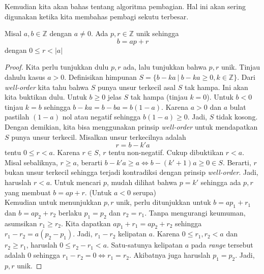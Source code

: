 	Kemudian kita akan bahas tentang algoritma pembagian. Hal ini akan sering digunakan ketika kita membahas pembagi sekutu terbesar.
	\begin{theorem}
		Misal $a,b \in \mathbb{Z}$ dengan $a \ne 0$. Ada $p,r \in \mathbb{Z}$ unik sehingga $$b = ap + r$$ dengan $0 \le r < |a|$
	\end{theorem}
	\begin{proof}
		Kita perlu tunjukkan dulu $p,r$ ada, lalu tunjukkan bahwa $p,r$ unik. Tinjau dahulu kasus $a > 0$. 
		Definisikan himpunan $S = \{ b - ka \ | \ b-ka \ge 0, k \in \mathbb{Z} \}$. Dari \textit{well-order} kita tahu bahwa $S$ punya unsur terkecil asal $S$ tak hampa. Ini akan kita buktikan dulu. Untuk $b \ge 0$ jelas $S$ tak hampa (tinjau $k = 0$). Untuk $b < 0$ tinjau $k = b$ sehingga $b - ka = b - ba = b(1-a)$. Karena $a > 0$ dan $a$ bulat pastilah $(1-a)$ nol atau negatif sehingga $b(1-a) \ge 0$. Jadi, $S$ tidak kosong. Dengan demikian, kita bisa menggunakan prinsip \textit{well-order} untuk mendapatkan $S$ punya unsur terkecil. Misalkan unsur terkecilnya adalah $$r = b - k'a$$ tentu $0 \le r < a$. Karena $r \in S$, $r$ tentu non-negatif. Cukup dibuktikan $r < a$. Misal sebaliknya, $r \ge a$, berarti $b - k'a \ge a \iff b - (k'+1)a \ge 0 \in S$. Berarti, $r$ bukan unsur terkecil sehingga terjadi kontradiksi dengan prinsip \textit{well-order}. Jadi, haruslah $r < a$. Untuk mencari $p$, mudah dilihat bahwa $p = k'$ sehingga ada $p,r$ yang membuat $b = ap + r$. (Untuk $a < 0$ serupa)
		\\
		
		Kemudian untuk menunjukkan $p,r$ unik, perlu ditunjukkan untuk $b = ap_1+r_1$ dan $b = ap_2 + r_2$ berlaku $p_1 = p_2$ dan $r_2 = r_1$. Tanpa mengurangi keumuman, asumsikan $r_1 \ge r_2$. Kita dapatkan $ap_1 + r_1 = ap_2 + r_2$ sehingga $r_1 - r_2 = a(p_2 - p_1)$. Jadi, $r_1 - r_2$ kelipatan $a$. Karena $0 \le r_1, r_2 < a$ dan $r_2 \ge r_1$, haruslah $0 \le r_2 - r_1 < a$. Satu-satunya kelipatan $a$ pada \textit{range} tersebut adalah $0$ sehingga $r_1 - r_2 = 0 \iff r_1 = r_2$. Akibatnya juga haruslah $p_1 = p_2$. Jadi, $p,r$ unik.
	\end{proof}
	
